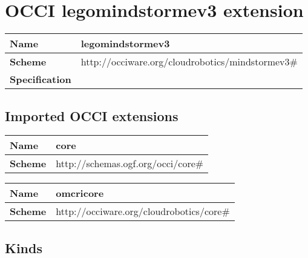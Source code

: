 \section{OCCI legomindstormev3 extension}
\begin{center}
\begin{tabular}{|l|l|}
  \hline
  \textbf{Name} & legomindstormev3 \\
  \hline  
  \textbf{Scheme} & http://occiware.org/cloudrobotics/mindstormev3\# \\
  \hline
  \textbf{Specification} &  \\
  \hline
\end{tabular}
\end{center}

\subsection{Imported OCCI extensions}

\begin{center} 
\begin{tabular}{|l|l|}
  \hline
  \textbf{Name} & core \\
  \hline  
  \textbf{Scheme} & http://schemas.ogf.org/occi/core\# \\
  \hline
\end{tabular}
\end{center}
\begin{center} 
\begin{tabular}{|l|l|}
  \hline
  \textbf{Name} & omcricore \\
  \hline  
  \textbf{Scheme} & http://occiware.org/cloudrobotics/core\# \\
  \hline
\end{tabular}
\end{center}


\subsection{Kinds}
